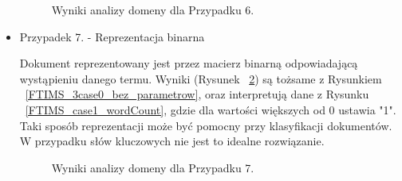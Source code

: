 \documentclass{classrep}
\begin{document}
\begin{itemize}
   
    \begin{figure}[H] 
    	\begin{center}
        \caption{Wyniki analizy domeny dla Przypadku 6.}
        \label{case6_IDFT_TFT_WordCount}
    	\end{center}
    \end{figure}


 \item  Przypadek 7. - Reprezentacja binarna
    
    Dokument reprezentowany jest przez macierz binarną odpowiadającą wystąpieniu danego termu. Wyniki (Rysunek ~\ref{FTIMS_case7_StringToNumeric}) są tożsame z Rysunkiem ~\ref{FTIMS_3case0_bez_parametrow}, oraz interpretują dane z Rysunku  ~\ref{FTIMS_case1_wordCount}, gdzie dla wartości większych od 0 ustawia "1". Taki sposób reprezentacji może być pomocny przy klasyfikacji dokumentów. W przypadku słów kluczowych nie jest to idealne rozwiązanie. 
    

    \begin{table}[H]
    \centering
    \caption{Parametry zastosowanego filtra StringToWordVector dla przypadku 7.}
    \label{tab:apriori_num_params}
    \end{table}
   
   
    \begin{figure}[H] 
    	\begin{center}
        \caption{Wyniki analizy domeny dla Przypadku 7.}
        \label{FTIMS_case7_StringToNumeric}
    	\end{center}
    \end{figure}



    \end{itemize}
    
\end{document}
